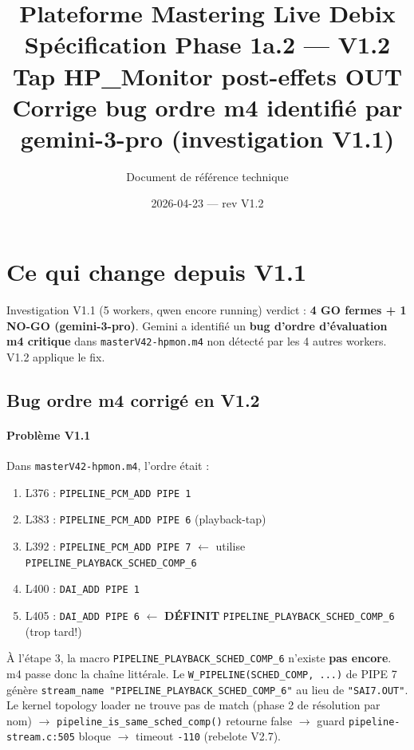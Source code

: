 \documentclass[11pt,a4paper]{article}
\title{\textbf{Plateforme Mastering Live Debix}\\[6pt]
  \Large Spécification Phase 1a.2 --- \textbf{V1.2}\\[4pt]
  \large Tap HP\_Monitor post-effets OUT\\
  \normalsize Corrige bug ordre m4 identifié par gemini-3-pro (investigation V1.1)}
\author{Document de référence technique}
\date{2026-04-23 --- rev V1.2}
\begin{document}
\maketitle
\tableofcontents
\clearpage

\section{Ce qui change depuis V1.1}

Investigation V1.1 (5 workers, qwen encore running) verdict : \textbf{4 GO fermes + 1 NO-GO (gemini-3-pro)}. Gemini a identifié un \textbf{bug d'ordre d'évaluation m4 critique} dans \texttt{masterV42-hpmon.m4} non détecté par les 4 autres workers. V1.2 applique le fix.

\subsection{Bug ordre m4 corrigé en V1.2}

\paragraph{Problème V1.1} Dans \texttt{masterV42-hpmon.m4}, l'ordre était :
\begin{enumerate}[leftmargin=*, itemsep=1pt]
  \item L376 : \texttt{PIPELINE\_PCM\_ADD PIPE 1}
  \item L383 : \texttt{PIPELINE\_PCM\_ADD PIPE 6} (playback-tap)
  \item L392 : \texttt{PIPELINE\_PCM\_ADD PIPE 7} $\leftarrow$ utilise \texttt{PIPELINE\_PLAYBACK\_SCHED\_COMP\_6}
  \item L400 : \texttt{DAI\_ADD PIPE 1}
  \item L405 : \texttt{DAI\_ADD PIPE 6} $\leftarrow$ \textbf{DÉFINIT} \texttt{PIPELINE\_PLAYBACK\_SCHED\_COMP\_6} (trop tard!)
\end{enumerate}

À l'étape 3, la macro \texttt{PIPELINE\_PLAYBACK\_SCHED\_COMP\_6} n'existe \textbf{pas encore}. m4 passe donc la chaîne littérale. Le \texttt{W\_PIPELINE(SCHED\_COMP, ...)} de PIPE 7 génère \texttt{stream\_name "PIPELINE\_PLAYBACK\_SCHED\_COMP\_6"} au lieu de \texttt{"SAI7.OUT"}. Le kernel topology loader ne trouve pas de match (phase 2 de résolution par nom) $\to$ \texttt{pipeline\_is\_same\_sched\_comp()} retourne false $\to$ guard \texttt{pipeline-stream.c:505} bloque $\to$ timeout \texttt{-110} (rebelote V2.7).
\end{document}
